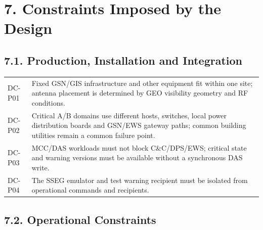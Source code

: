 \section{7. Constraints Imposed by the Design}\label{system-design-constraints}

\subsection{7.1. Production, Installation and Integration}\label{production-and-integration-constraints}

\begingroup{}
\begin{longtable}{|P{0.16}|P{0.84}|}
\hline{}
 & \\ \hline
\endhead
\hline\endlastfoot
DC-P01 & Fixed GSN/\allowbreak{}GIS infrastructure and other equipment fit within one site; antenna placement is determined by GEO visibility geometry and RF conditions.\\ \hline
DC-P02 & Critical A/\allowbreak{}B domains use different hosts, switches, local power distribution boards and GSN/\allowbreak{}EWS gateway paths; common building utilities remain a common failure point.\\ \hline
DC-P03 & MCC/\allowbreak{}DAS workloads must not block C\&C/\allowbreak{}DPS/\allowbreak{}EWS; critical state and warning versions must be available without a synchronous DAS write.\\ \hline
DC-P04 & The SSEG emulator and test warning recipient must be isolated from operational commands and recipients.\\*
\end{longtable}
\endgroup

\subsection{7.2. Operational Constraints}\label{operational-constraints}

